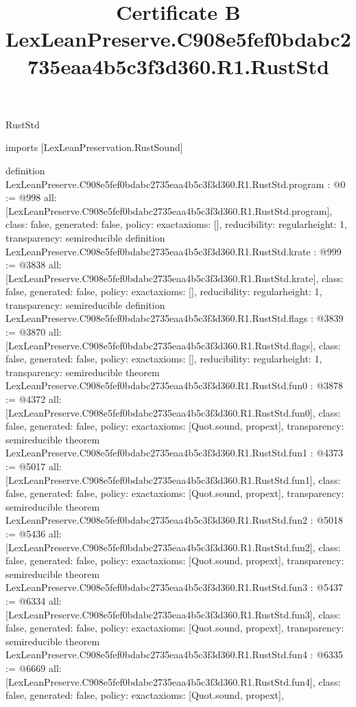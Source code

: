\begin{lexlean}{RustStd}
\title{Certificate B LexLeanPreserve.C908e5fef0bdabc2735eaa4b5c3f3d360.R1.RustStd}
\begin{coremodule}
imports [LexLeanPreservation.RustSound]

definition LexLeanPreserve.C908e5fef0bdabc2735eaa4b5c3f3d360.R1.RustStd.program : @0 := @998 {
  all: [LexLeanPreserve.C908e5fef0bdabc2735eaa4b5c3f3d360.R1.RustStd.program],
  class: false,
  generated: false,
  policy: exact{axioms: []},
  reducibility: regular{height: 1},
  transparency: semireducible
}
definition LexLeanPreserve.C908e5fef0bdabc2735eaa4b5c3f3d360.R1.RustStd.krate : @999 := @3838 {
  all: [LexLeanPreserve.C908e5fef0bdabc2735eaa4b5c3f3d360.R1.RustStd.krate],
  class: false,
  generated: false,
  policy: exact{axioms: []},
  reducibility: regular{height: 1},
  transparency: semireducible
}
definition LexLeanPreserve.C908e5fef0bdabc2735eaa4b5c3f3d360.R1.RustStd.flags : @3839 := @3870 {
  all: [LexLeanPreserve.C908e5fef0bdabc2735eaa4b5c3f3d360.R1.RustStd.flags],
  class: false,
  generated: false,
  policy: exact{axioms: []},
  reducibility: regular{height: 1},
  transparency: semireducible
}
theorem LexLeanPreserve.C908e5fef0bdabc2735eaa4b5c3f3d360.R1.RustStd.fun0 : @3878 := @4372 {
  all: [LexLeanPreserve.C908e5fef0bdabc2735eaa4b5c3f3d360.R1.RustStd.fun0],
  class: false,
  generated: false,
  policy: exact{axioms: [Quot.sound, propext]},
  transparency: semireducible
}
theorem LexLeanPreserve.C908e5fef0bdabc2735eaa4b5c3f3d360.R1.RustStd.fun1 : @4373 := @5017 {
  all: [LexLeanPreserve.C908e5fef0bdabc2735eaa4b5c3f3d360.R1.RustStd.fun1],
  class: false,
  generated: false,
  policy: exact{axioms: [Quot.sound, propext]},
  transparency: semireducible
}
theorem LexLeanPreserve.C908e5fef0bdabc2735eaa4b5c3f3d360.R1.RustStd.fun2 : @5018 := @5436 {
  all: [LexLeanPreserve.C908e5fef0bdabc2735eaa4b5c3f3d360.R1.RustStd.fun2],
  class: false,
  generated: false,
  policy: exact{axioms: [Quot.sound, propext]},
  transparency: semireducible
}
theorem LexLeanPreserve.C908e5fef0bdabc2735eaa4b5c3f3d360.R1.RustStd.fun3 : @5437 := @6334 {
  all: [LexLeanPreserve.C908e5fef0bdabc2735eaa4b5c3f3d360.R1.RustStd.fun3],
  class: false,
  generated: false,
  policy: exact{axioms: [Quot.sound, propext]},
  transparency: semireducible
}
theorem LexLeanPreserve.C908e5fef0bdabc2735eaa4b5c3f3d360.R1.RustStd.fun4 : @6335 := @6669 {
  all: [LexLeanPreserve.C908e5fef0bdabc2735eaa4b5c3f3d360.R1.RustStd.fun4],
  class: false,
  generated: false,
  policy: exact{axioms: [Quot.sound, propext]},
}
\end{coremodule}
\end{lexlean}
